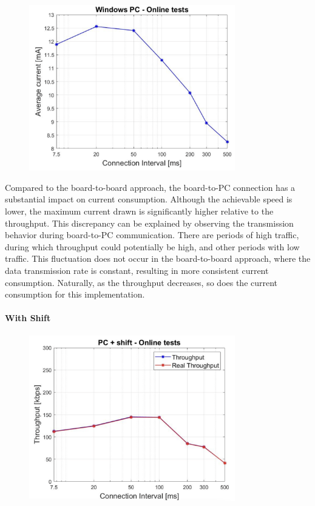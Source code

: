 \documentclass{Configuration_Files/PoliMi3i_thesis}
\begin{document}
\begin{figure}[h!]
    \centering
    \includegraphics[width=0.8\textwidth]{Results Manuel/figure36}
    \label{fig:figure1}
\end{figure}

Compared to the board-to-board approach, the board-to-PC connection has a substantial impact on current consumption. Although the achievable speed is lower, the maximum current drawn is significantly higher relative to the throughput. This discrepancy can be explained by observing the transmission behavior during board-to-PC communication. There are periods of high traffic, during which throughput could potentially be high, and other periods with low traffic. This fluctuation does not occur in the board-to-board approach, where the data transmission rate is constant, resulting in more consistent current consumption. Naturally, as the throughput decreases, so does the current consumption for this implementation.

\paragraph{With Shift}

\begin{figure}[h!]
    \centering
    \includegraphics[width=0.8\textwidth]{Results Manuel/figure37}
    \label{fig:figure1}
\end{figure}
\end{document}
